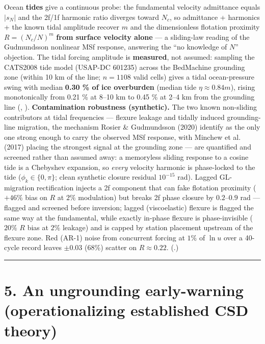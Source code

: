 \documentclass[11pt]{article}
\begin{document}
Ocean \textbf{tides} give a continuous probe: the fundamental velocity admittance equals $|s_{N}|$ and the 2f/1f harmonic ratio diverges toward $N_{c}$, so admittance + harmonics + the known tidal amplitude recover $m$ and the dimensionless flotation proximity $R=(N_{c}/N)^{m}$ \textbf{from surface velocity alone} — a sliding-law reading of the Gudmundsson nonlinear MSf response, answering the ``no knowledge of $N$'' objection. The tidal forcing amplitude is \textbf{measured}, not assumed: sampling the CATS2008 tide model (USAP-DC 601235) across the BedMachine grounding zone (within 10 km of the line; $n=1108$ valid cells) gives a tidal ocean-pressure swing with median \textbf{0.30 \% of ice overburden} (median tide $\eta \approx 0.84 m$), rising monotonically from 0.21 \% at 8–10 km to 0.45 \% at 2–4 km from the grounding line (, ). \textbf{Contamination robustness (synthetic).} The two known non-sliding contributors at tidal frequencies — flexure leakage and tidally induced grounding-line migration, the mechanism Rosier \& Gudmundsson (2020) identify as the only one strong enough to carry the observed MSf response, with Minchew et al. (2017) placing the strongest signal at the grounding zone — are quantified and screened rather than assumed away: a memoryless sliding response to a cosine tide is a Chebyshev expansion, so \emph{every} velocity harmonic is phase-locked to the tide ($\phi _{k}\in \{0,\pi \}$; clean synthetic closure residual $10^{-15}$ rad). Lagged GL-migration rectification injects a 2f component that can fake flotation proximity ($+46\%$ bias on $R$ at $2\%$ modulation) but breaks 2f phase closure by $0.2$–$0.9$ rad — flagged and screened before inversion; lagged (viscoelastic) flexure is flagged the same way at the fundamental, while exactly in-phase flexure is phase-invisible ($20\%$ $R$ bias at $2\%$ leakage) and is capped by station placement upstream of the flexure zone. Red (AR-1) noise from concurrent forcing at $1\%$ of $\ln u$ over a 40-cycle record leaves $\pm 0.03$ (68\%) scatter on $R\approx 0.22$. (.)


\medskip\hrule\medskip


\section*{5. An ungrounding early-warning (operationalizing established CSD theory)}
\end{document}

